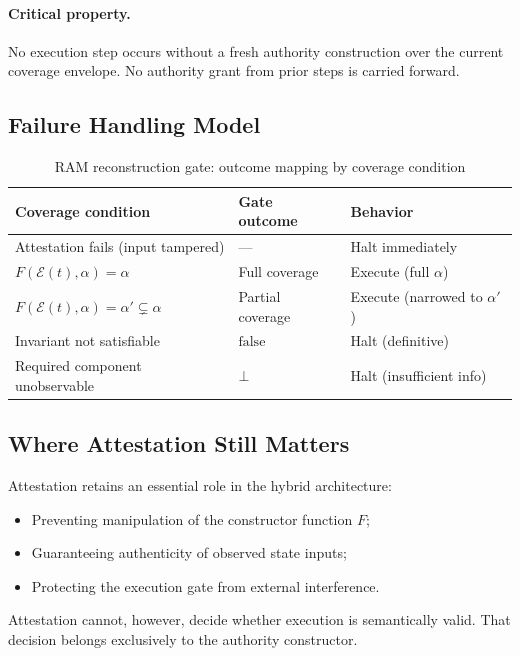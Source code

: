 \documentclass[11pt]{article}
\newcommand{\Ndefval}{\bot}
\begin{document}
\paragraph{Critical property.} No execution step occurs without a fresh
authority construction over the current coverage envelope.
No authority grant from prior steps is carried forward.

\subsection{Failure Handling Model}

\begin{table}[H]
\centering
\caption{RAM reconstruction gate: outcome mapping by coverage condition}
\begin{tabular}{lll}
\toprule
\textbf{Coverage condition} & \textbf{Gate outcome} & \textbf{Behavior} \\
\midrule
Attestation fails (input tampered)        & --- & Halt immediately \\
$F(\mathcal{E}(t),\alpha) = \alpha$        & Full coverage & Execute (full $\alpha$) \\
$F(\mathcal{E}(t),\alpha) = \alpha' \subsetneq \alpha$ & Partial coverage & Execute (narrowed to $\alpha'$) \\
Invariant not satisfiable                 & $\text{false}$ & Halt (definitive) \\
Required component unobservable           & $\Ndefval$ & Halt (insufficient info) \\
\bottomrule
\end{tabular}
\end{table}

\subsection{Where Attestation Still Matters}

Attestation retains an essential role in the hybrid architecture:
\begin{itemize}
  \item Preventing manipulation of the constructor function $F$;
  \item Guaranteeing authenticity of observed state inputs;
  \item Protecting the execution gate from external interference.
\end{itemize}

Attestation cannot, however, decide whether execution is semantically valid.
That decision belongs exclusively to the authority constructor.
\end{document}
